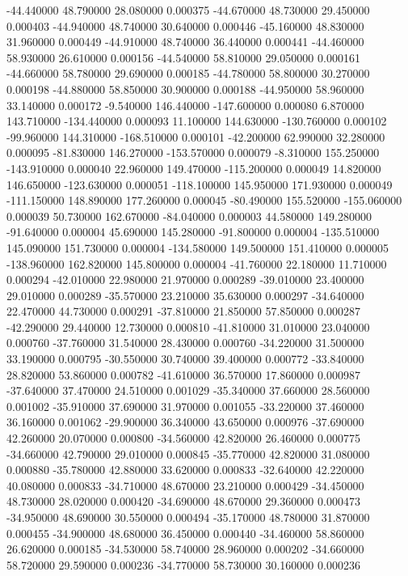 -44.440000 48.790000 28.080000 0.000375 
-44.670000 48.730000 29.450000 0.000403 
-44.940000 48.740000 30.640000 0.000446 
-45.160000 48.830000 31.960000 0.000449 
-44.910000 48.740000 36.440000 0.000441 
-44.460000 58.930000 26.610000 0.000156 
-44.540000 58.810000 29.050000 0.000161 
-44.660000 58.780000 29.690000 0.000185 
-44.780000 58.800000 30.270000 0.000198 
-44.880000 58.850000 30.900000 0.000188 
-44.950000 58.960000 33.140000 0.000172 
-9.540000 146.440000 -147.600000 0.000080 
6.870000 143.710000 -134.440000 0.000093 
11.100000 144.630000 -130.760000 0.000102 
-99.960000 144.310000 -168.510000 0.000101 
-42.200000 62.990000 32.280000 0.000095 
-81.830000 146.270000 -153.570000 0.000079 
-8.310000 155.250000 -143.910000 0.000040 
22.960000 149.470000 -115.200000 0.000049 
14.820000 146.650000 -123.630000 0.000051 
-118.100000 145.950000 171.930000 0.000049 
-111.150000 148.890000 177.260000 0.000045 
-80.490000 155.520000 -155.060000 0.000039 
50.730000 162.670000 -84.040000 0.000003 
44.580000 149.280000 -91.640000 0.000004 
45.690000 145.280000 -91.800000 0.000004 
-135.510000 145.090000 151.730000 0.000004 
-134.580000 149.500000 151.410000 0.000005 
-138.960000 162.820000 145.800000 0.000004 
-41.760000 22.180000 11.710000 0.000294 
-42.010000 22.980000 21.970000 0.000289 
-39.010000 23.400000 29.010000 0.000289 
-35.570000 23.210000 35.630000 0.000297 
-34.640000 22.470000 44.730000 0.000291 
-37.810000 21.850000 57.850000 0.000287 
-42.290000 29.440000 12.730000 0.000810 
-41.810000 31.010000 23.040000 0.000760 
-37.760000 31.540000 28.430000 0.000760 
-34.220000 31.500000 33.190000 0.000795 
-30.550000 30.740000 39.400000 0.000772 
-33.840000 28.820000 53.860000 0.000782 
-41.610000 36.570000 17.860000 0.000987 
-37.640000 37.470000 24.510000 0.001029 
-35.340000 37.660000 28.560000 0.001002 
-35.910000 37.690000 31.970000 0.001055 
-33.220000 37.460000 36.160000 0.001062 
-29.900000 36.340000 43.650000 0.000976 
-37.690000 42.260000 20.070000 0.000800 
-34.560000 42.820000 26.460000 0.000775 
-34.660000 42.790000 29.010000 0.000845 
-35.770000 42.820000 31.080000 0.000880 
-35.780000 42.880000 33.620000 0.000833 
-32.640000 42.220000 40.080000 0.000833 
-34.710000 48.670000 23.210000 0.000429 
-34.450000 48.730000 28.020000 0.000420 
-34.690000 48.670000 29.360000 0.000473 
-34.950000 48.690000 30.550000 0.000494 
-35.170000 48.780000 31.870000 0.000455 
-34.900000 48.680000 36.450000 0.000440 
-34.460000 58.860000 26.620000 0.000185 
-34.530000 58.740000 28.960000 0.000202 
-34.660000 58.720000 29.590000 0.000236 
-34.770000 58.730000 30.160000 0.000236 
